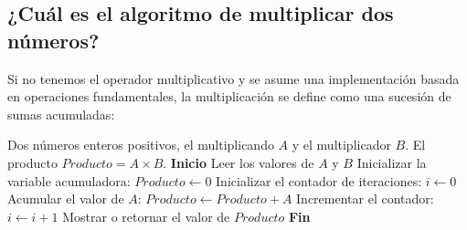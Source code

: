 \documentclass[12pt]{article}
\begin{document}
\subsection{¿Cuál es el algoritmo de multiplicar dos números?}
Si no tenemos el operador multiplicativo y se asume una implementación basada en operaciones fundamentales, la multiplicación se define como una sucesión de sumas acumuladas:
\begin{algorithm}[H]
\caption{Multiplicación mediante sumas sucesivas}
\begin{algorithmic}[1]
    \REQUIRE Dos números enteros positivos, el multiplicando $A$ y el multiplicador $B$.
    \ENSURE El producto $Producto = A \times B$.
    \STATE \textbf{Inicio}
    \STATE Leer los valores de $A$ y $B$
    \STATE Inicializar la variable acumuladora: $Producto \leftarrow 0$
    \STATE Inicializar el contador de iteraciones: $i \leftarrow 0$
        \STATE Acumular el valor de $A$: $Producto \leftarrow Producto + A$
        \STATE Incrementar el contador: $i \leftarrow i + 1$
    \ENDWHILE
    \STATE Mostrar o retornar el valor de $Producto$
    \STATE \textbf{Fin}
\end{algorithmic}
\end{algorithm}
\end{document}
